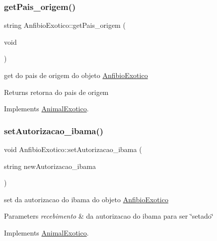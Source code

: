 \subsubsection{\texorpdfstring{getPais\_origem()}{getPais\_origem()}}
{\footnotesize\ttfamily string Anfibio\+Exotico\+::get\+Pais\+\_\+origem (\begin{DoxyParamCaption}\item[{void}]{ }\end{DoxyParamCaption})\hspace{0.3cm}{\ttfamily [virtual]}}



get do pais de origem do objeto \mbox{\hyperlink{class_anfibio_exotico}{Anfibio\+Exotico}} 

\begin{DoxyReturn}{Returns}
retorna do pais de origem 
\end{DoxyReturn}


Implements \mbox{\hyperlink{class_animal_exotico}{Animal\+Exotico}}.

\mbox{\label{class_anfibio_exotico_a7cbbeb699ceaa0bcf42bfd0815286e1c}} 
\subsubsection{\texorpdfstring{setAutorizacao\_ibama()}{setAutorizacao\_ibama()}}
{\footnotesize\ttfamily void Anfibio\+Exotico\+::set\+Autorizacao\+\_\+ibama (\begin{DoxyParamCaption}\item[{string}]{new\+Autorizacao\+\_\+ibama }\end{DoxyParamCaption})\hspace{0.3cm}{\ttfamily [virtual]}}



set da autorizacao do ibama do objeto \mbox{\hyperlink{class_anfibio_exotico}{Anfibio\+Exotico}} 


\begin{DoxyParams}{Parameters}
{\em recebimento} & da autorizacao do ibama para ser \char`\"{}setado\char`\"{} \\
\hline
\end{DoxyParams}


Implements \mbox{\hyperlink{class_animal_exotico_a3931a6cc8ae2d7d8e1efd6e399a63bf7}{Animal\+Exotico}}.

